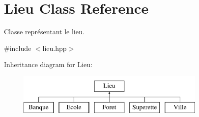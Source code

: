 \hypertarget{class_lieu}{\section{Lieu Class Reference}
\label{class_lieu}
}


Classe représentant le lieu.  




{\ttfamily \#include $<$lieu.\-hpp$>$}

Inheritance diagram for Lieu\-:\begin{figure}[H]
\begin{center}
\leavevmode
\includegraphics[height=2.000000cm]{class_lieu}
\end{center}
\end{figure}
